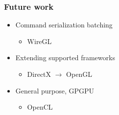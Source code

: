 \begin{frame}

\frametitle{Future work}

\begin{itemize}
  \item Command serialization batching \begin{itemize}\item WireGL\end{itemize}
  \item Extending supported frameworks \begin{itemize}\item DirectX $\rightarrow$ OpenGL\end{itemize}
  \item General purpose, GPGPU \begin{itemize}\item OpenCL\end{itemize}
\end{itemize}

\end{frame}
